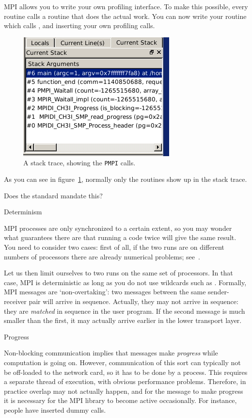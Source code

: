 MPI allows you to write your own profiling interface. To make this possible,
every routine  calls a routine  that 
does the actual work. You can now write your  routine
which calls , and inserting your own profiling calls.
\begin{figure}[ht]
  \includegraphics[scale=.7]{graphics/pmpi}
  \caption{A stack trace, showing the \texttt{PMPI} calls.}
  \label{fig:pmpi}
\end{figure}
As you can see in figure~\ref{fig:pmpi}, normally only the  routines
show up in the stack trace.

Does the standard mandate this?

 {Determinism}
\label{sec:mpi-semantics}

MPI processes are only synchronized to a certain extent, so you may
wonder what guarantees there are that running a code twice will give
the same result.  You need to consider two cases: first of all, if the
two runs are on different numbers of processors there are already
numerical problems; see~.

Let us then limit ourselves to two runs on the same set of processors. 
In that case, MPI is deterministic as long as you do not use 
wildcards such as . Formally, 
MPI messages are `non-overtaking': two messages between the same
sender-receiver pair will arrive in sequence.
Actually, they may not arrive in sequence: they are \emph{matched}
in sequence in the user program. If the second message is much smaller than the first,
it may actually arrive earlier in the lower transport layer.


 {Progress}

Non-blocking communication implies that messages make \emph{progress}
while computation is going on. However, communication of this sort can 
typically not be off-loaded to the network card, so it has to be done by 
a process. This requires a separate thread of execution, with
obvious performance problems. Therefore, in practice overlap may
not actually happen, and for the message to make progress
it is necessary for the MPI library to become active occasionally.
For instance, people have inserted dummy  calls.

